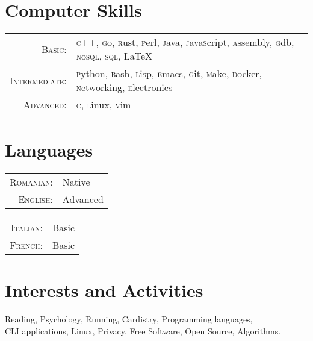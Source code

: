 \documentclass[a4paper,10pt]{article}
\begin{document}
\section{Computer Skills}
\begin{tabular}{rl}
\textsc{Basic:}&
  \textsc{c}++, \textsc{g}o, \textsc{r}ust,
  \textsc{p}erl, \textsc{j}ava, 
  \textsc{j}ava\textsc{s}cript,
  \textsc{a}ssembly, \textsc{g}db, 
  \textsc{n}o\textsc{sql}, \textsc{sql}, 
  \LaTeX\\
\textsc{Intermediate:}&
  \textsc{p}ython, \textsc{b}ash,
  \textsc{l}isp, \textsc{e}macs,
  \textsc{g}it, \textsc{m}ake, 
  \textsc{d}ocker, \textsc{n}etworking,  
  \textsc{e}lectronics\\ 
\textsc{Advanced}:&
  \textsc{c}, \textsc{l}inux, \textsc{v}im\\

\end{tabular}


\section{Languages}
\begin{multicols}{2}
  \begin{tabular}{rl}
    \textsc{Romanian:}&Native\\
    \textsc{English:}&Advanced\\
  \end{tabular}
  \columnbreak
  \begin{tabular}{rl}
    \textsc{Italian:}&Basic\\
    \textsc{French:}&Basic\\
  \end{tabular}
\end{multicols}

\section{Interests and Activities}
Reading, Psychology, Running, Cardistry, Programming languages, \\ 
CLI applications, Linux, Privacy, Free Software, Open Source, Algorithms.
\end{document}
